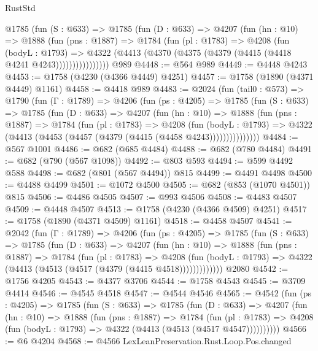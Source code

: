 \begin{lexlean}{RustStd}
\begin{coremodule}
{\begin{coremodule}
{{{{{{{{{{{{{{{          @1785
            (fun (S : @633) =>
            @1785
              (fun (D : @633) =>
              @4207
                (fun (hn : @10) =>
                @1888
                  (fun (pns : @1887) =>
                  @1784
                    (fun (pl : @1783) =>
                    @4208
                      (fun (bodyL : @1793) =>
                      @4322 (@4413 (@4370 (@4375 (@4379 (@4415 (@4418 @4241 @4243))))))))))))))))
    @989
@4448 := @564 @989
@4449 := @4448 @4243
@4453 := @1758 (@4230 (@4366 @4449) @4251)
@4457 := @1758 (@1890 (@4371 @4449) @1161)
@4458 := @4418 @989
@4483 := @2024
    (fun (tail0 : @573) =>
    @1790
      (fun (Γ : @1789) =>
      @4206
        (fun (ps : @4205) =>
        @1785
          (fun (S : @633) =>
          @1785
            (fun (D : @633) =>
            @4207
              (fun (hn : @10) =>
              @1888
                (fun (pns : @1887) =>
                @1784
                  (fun (pl : @1783) =>
                  @4208
                    (fun (bodyL : @1793) =>
                    @4322 (@4413 (@4453 (@4457 (@4379 (@4415 (@4458 @4243)))))))))))))))
@4484 := @567 @1001
@4486 := @682 (@685 @4484)
@4488 := @682 (@780 @4484)
@4491 := @682 (@790 (@567 @1098))
@4492 := @803 @593
@4494 := @599 @4492 @588
@4498 := @682 (@801 (@567 @4494)) @815
@4499 := @4491 @4498
@4500 := @4488 @4499
@4501 := @1072 @4500
@4505 := @682 (@853 (@1070 @4501)) @815
@4506 := @4486 @4505
@4507 := @993 @4506
@4508 := @4483 @4507
@4509 := @4448 @4507
@4513 := @1758 (@4230 (@4366 @4509) @4251)
@4517 := @1758 (@1890 (@4371 @4509) @1161)
@4518 := @4458 @4507
@4541 := @2042
    (fun (Γ : @1789) =>
    @4206
      (fun (ps : @4205) =>
      @1785
        (fun (S : @633) =>
        @1785
          (fun (D : @633) =>
          @4207
            (fun (hn : @10) =>
            @1888
              (fun (pns : @1887) =>
              @1784
                (fun (pl : @1783) =>
                @4208
                  (fun (bodyL : @1793) =>
                  @4322 (@4413 (@4513 (@4517 (@4379 (@4415 @4518)))))))))))))
    @2080
@4542 := @1756 @4205
@4543 := @4377 @3706
@4544 := @1758 @4543
@4545 := @3709 @4414
@4546 := @4545 @4518
@4547 := @4544 @4546
@4565 := @4542
    (fun (ps : @4205) =>
    @1785
      (fun (S : @633) =>
      @1785
        (fun (D : @633) =>
        @4207
          (fun (hn : @10) =>
          @1888
            (fun (pns : @1887) =>
            @1784
              (fun (pl : @1783) =>
              @4208 (fun (bodyL : @1793) => @4322 (@4413 (@4513 (@4517 @4547))))))))))
@4566 := @6 @4204
@4568 := @4566 LexLeanPreservation.Rust.Loop.Pos.changed
}}}}}}}}}}}}}}}
\end{coremodule}}
\end{coremodule}
\end{lexlean}
